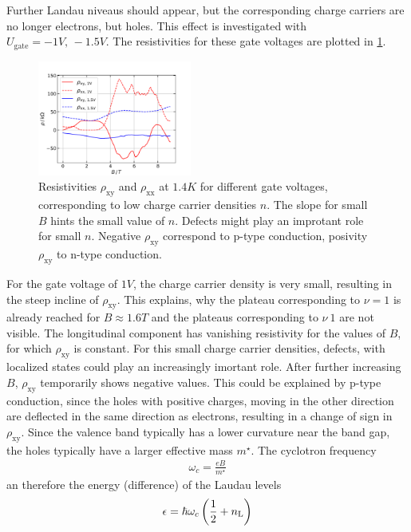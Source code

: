 Further Landau niveaus should appear, but the corresponding charge carriers are no longer electrons, but holes.
This effect is investigated with $U_\text{gate}=-1V,\,-1.5V$.
The resistivities for these gate voltages are plotted in \ref{fig:kaputteKurvenGateV}.
\begin{figure}[h]
    \centering
    \includegraphics[width=0.45\textwidth]{../Images/kaputteKurvenGateV.png}
    \caption{
        Resistivities $\rho_\text{xy}$ and $\rho_\text{xx}$ at $1.4K$ for different gate voltages, 
        corresponding to low charge carrier densities $n$.  
        The slope for small $B$ hints the small value of $n$.
        Defects might play an improtant role for small $n$.
        Negative $\rho_\text{xy}$ correspond to p-type conduction, posivity $\rho_\text{xy}$ to n-type conduction.}
    \label{fig:kaputteKurvenGateV}
\end{figure}
For the gate voltage of $1V$, the charge carrier density is very small, resulting in the steep incline of $\rho_\text{xy}$.
This explains, why the plateau corresponding to $\nu=1$ is already reached for $B\approx1.6T$ and 
the plateaus corresponding to  $\nu\>1$ are not visible.
The longitudinal component has vanishing resistivity for the values of $B$, for which $\rho_\text{xy}$ is constant.
For this small charge carrier densities, defects, with localized states could play an increasingly imortant role.
After further increasing $B$, $\rho_\text{xy}$ temporarily shows negative values.
This could be explained by p-type conduction, since the holes with positive charges, 
moving in the other direction are deflected in the same direction as electrons, resulting in a change of sign in $\rho_\text{xy}$.
Since the valence band typically has a lower curvature near the band gap, the holes typically have a larger effective mass $m^\star$.
The cyclotron frequency
\begin{align}
    \omega_c = \frac{eB}{m^\star}    
\end{align}
an therefore the energy (difference) of the Laudau levels
\begin{align}
    \epsilon = \hbar \omega_c \left(\frac{1}{2} + n_\text L \right)
\end{align}
